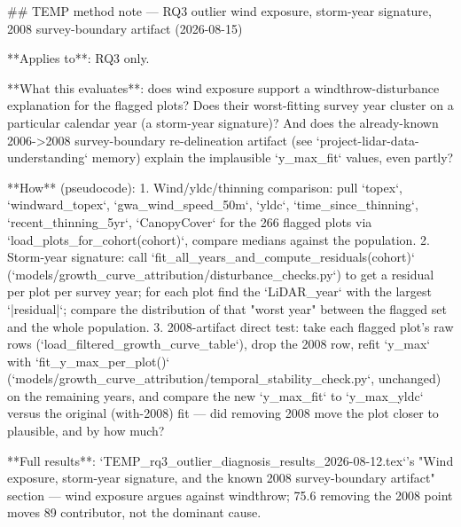 ## TEMP method note — RQ3 outlier wind exposure, storm-year signature, 2008 survey-boundary artifact (2026-08-15)

**Applies to**: RQ3 only.

**What this evaluates**: does wind exposure support a windthrow-disturbance explanation for the
flagged plots? Does their worst-fitting survey year cluster on a particular calendar year (a
storm-year signature)? And does the already-known 2006->2008 survey-boundary re-delineation
artifact (see `project-lidar-data-understanding` memory) explain the implausible `y_max_fit`
values, even partly?

**How** (pseudocode):
1. Wind/yldc/thinning comparison: pull `topex`, `windward_topex`, `gwa_wind_speed_50m`, `yldc`,
   `time_since_thinning`, `recent_thinning_5yr`, `CanopyCover` for the 266 flagged plots via
   `load_plots_for_cohort(cohort)`, compare medians against the population.
2. Storm-year signature: call `fit_all_years_and_compute_residuals(cohort)`
   (`models/growth_curve_attribution/disturbance_checks.py`) to get a residual per plot per survey
   year; for each plot find the `LiDAR_year` with the largest `|residual|`; compare the distribution
   of that "worst year" between the flagged set and the whole population.
3. 2008-artifact direct test: take each flagged plot's raw rows (`load_filtered_growth_curve_table`),
   drop the 2008 row, refit `y_max` with `fit_y_max_per_plot()`
   (`models/growth_curve_attribution/temporal_stability_check.py`, unchanged) on the remaining
   years, and compare the new `y_max_fit` to `y_max_yldc` versus the original (with-2008) fit — did
   removing 2008 move the plot closer to plausible, and by how much?

**Full results**: `TEMP_rq3_outlier_diagnosis_results_2026-08-12.tex`'s "Wind exposure, storm-year
signature, and the known 2008 survey-boundary artifact" section — wind exposure argues against
windthrow; 75.6%
removing the 2008 point moves 89%
contributor, not the dominant cause.
